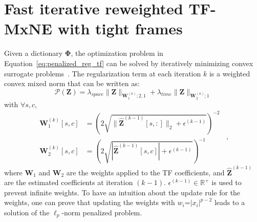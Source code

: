 \section{Fast iterative reweighted TF-MxNE with tight frames}
Given a dictionary $\mathbf{\Phi}$, the optimization problem in Equation~\eqref{eq:penalized_reg_tf} can be solved by iteratively minimizing convex surrogate problems~\cite{daniel15}. The regularization term at each iteration $k$ is a weighted convex mixed norm that can be written as:
\begin{equation} \label{eq:weights_optim}
    \mathcal{P}(\mathbf{Z}) = \lambda_{space}\|\mathbf{Z}\|_{\mathbf{W}_1^{(k)};2,1} + \lambda_{time}\|\mathbf{Z}\|_{\mathbf{W}_2^{(k)};1}
\end{equation}
with $\forall s,c$,
\begin{equation*}
\begin{aligned}
    \mathbf{W}_1^{(k)}[s,c] &= \left(2\sqrt{\|\hat{\mathbf{Z}}^{(k-1)}[s,:]\|_2 + \epsilon^{(k-1)}}\right)^{-2} \\
    \mathbf{W}_2^{(k)}[s,c] &= \left(2\sqrt{|\hat{\mathbf{Z}}^{(k-1)}[s,c]| + \epsilon^{(k-1)}}\right)^{-1}
\end{aligned} \enspace ,
\end{equation*}
%
where $\mathbf{W}_1$ and $\mathbf{W}_2$ are the weights applied to the TF coefficients, and $\mathbf{\hat{Z}}^{(k-1)}$ are the estimated coefficients at iteration $(k-1)$. $\epsilon^{(k-1)} \in \mathbb{R}^+$ is used to prevent infinite weights. To have an intuition about the update rule for the weights, one can prove that updating the weights with $w_i$=$|x_i|^{p-2}$ leads to a solution of the $\ell_p$-norm penalized problem.\\

